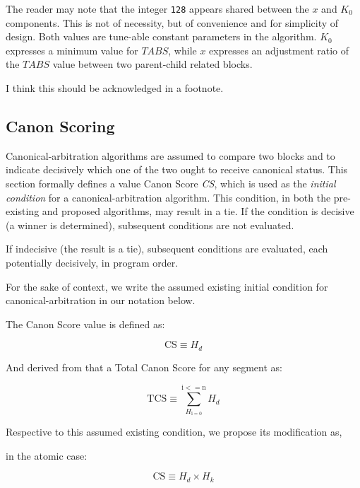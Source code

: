 \documentclass[11pt]{article}
\theoremstyle{plain}
\begin{document}
The reader may note that the integer \texttt{128} appears shared between the
$x$ and $K_0$ components.
This is not of necessity, but of convenience and for simplicity of design.
Both values are tune-able constant parameters in the algorithm.
$K_0$ expresses a minimum value for $TABS$, while $x$ expresses an adjustment
ratio of the $TABS$ value between two parent-child related blocks.

I think this should be acknowledged in a footnote.

\subsection{\small{Canon Scoring}}\label{sec: S4}

Canonical-arbitration algorithms are assumed to compare two blocks and to
indicate decisively which one of the two ought to receive canonical status.
This section formally defines a value Canon Score \textit{CS}, which is used as
the \textit{initial condition} for a canonical-arbitration algorithm.
This condition, in both the pre-existing and proposed algorithms, may result in
a tie. If the condition is decisive (a winner is determined), subsequent
conditions are not evaluated.

If indecisive (the result is a tie), subsequent conditions are evaluated, each
potentially decisively, in program order.

For the sake of context, we write the assumed existing initial condition for
canonical-arbitration in our notation below.

The Canon Score value is defined as:

\begin{equation}
\mathrm{CS} \equiv H_d
\end{equation}

And derived from that a Total Canon Score for any segment as:

\begin{equation}
\mathrm{TCS} \equiv \sum_{H_\mathrm{i = 0}}^{\mathrm{i <= n}} H_d
\end{equation}

Respective to this assumed existing condition, we propose its modification as,

in the atomic case:

\begin{equation}
\mathrm{CS} \equiv H_d \times H_k
\end{equation}
\end{document}
